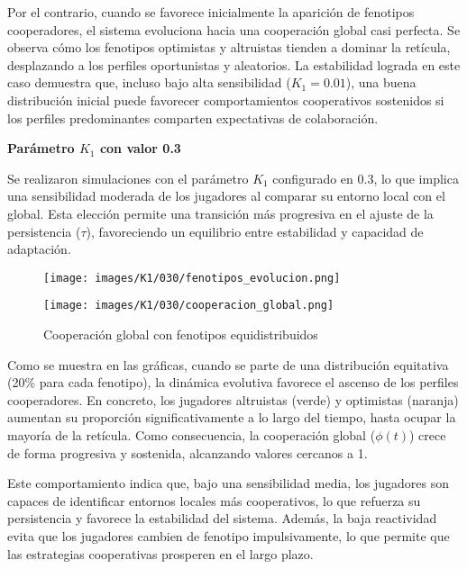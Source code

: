 \documentclass[a4paper,12pt]{report}
\begin{document}
Por el contrario, cuando se favorece inicialmente la aparición de fenotipos cooperadores, el sistema evoluciona hacia una cooperación global casi perfecta. Se observa cómo los fenotipos optimistas y altruistas tienden a dominar la retícula, desplazando a los perfiles oportunistas y aleatorios. La estabilidad lograda en este caso demuestra que, incluso bajo alta sensibilidad (\( K_1 = 0.01 \)), una buena distribución inicial puede favorecer comportamientos cooperativos sostenidos si los perfiles predominantes comparten expectativas de colaboración.


\newpage

\vspace{1.5em}
\noindent\textbf{Parámetro \( K_1 \) con valor 0.3}
\vspace{0.5em}



Se realizaron simulaciones con el parámetro \( K_1 \) configurado en 0.3, lo que implica una sensibilidad moderada de los jugadores al comparar su entorno local con el global. Esta elección permite una transición más progresiva en el ajuste de la persistencia (\( \tau \)), favoreciendo un equilibrio entre estabilidad y capacidad de adaptación.


\begin{figure}[h!]
    \centering
    \begin{minipage}{0.49\textwidth}
    \centering
    \texttt{[image: images/K1/030/fenotipos\_evolucion.png]}
    \label{fig:enter-label}
    \end{minipage}
    \hfill
    \begin{minipage}{0.49\textwidth}
    \centering
    \texttt{[image: images/K1/030/cooperacion\_global.png]}
    \label{fig:enter-label}
    \end{minipage}
    \caption{Cooperación global con fenotipos equidistribuidos}
\end{figure}

Como se muestra en las gráficas, cuando se parte de una distribución equitativa (20\% para cada fenotipo), la dinámica evolutiva favorece el ascenso de los perfiles cooperadores. En concreto, los jugadores altruistas (verde) y optimistas (naranja) aumentan su proporción significativamente a lo largo del tiempo, hasta ocupar la mayoría de la retícula. Como consecuencia, la cooperación global (\( \phi(t) \)) crece de forma progresiva y sostenida, alcanzando valores cercanos a 1.

Este comportamiento indica que, bajo una sensibilidad media, los jugadores son capaces de identificar entornos locales más cooperativos, lo que refuerza su persistencia y favorece la estabilidad del sistema. Además, la baja reactividad evita que los jugadores cambien de fenotipo impulsivamente, lo que permite que las estrategias cooperativas prosperen en el largo plazo.
\end{document}
